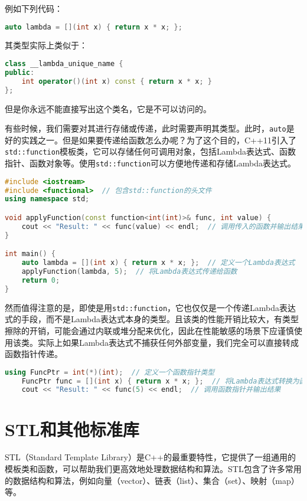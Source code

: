 例如下列代码：
\begin{lstlisting}[language=C++]
auto lambda = [](int x) { return x * x; };  
\end{lstlisting}
其类型实际上类似于：
\begin{lstlisting}[language=C++]
class __lambda_unique_name {
public:
    int operator()(int x) const { return x * x; }
};
\end{lstlisting}
但是你永远不能直接写出这个类名，它是不可以访问的。

有些时候，我们需要对其进行存储或传递，此时需要声明其类型。此时，\texttt{auto}是好的实践之一。但是如果要传递给函数怎么办呢？为了这个目的，C++11引入了\texttt{std::function}模板类，它可以存储任何可调用对象，包括Lambda表达式、函数指针、函数对象等。使用\texttt{std::function}可以方便地传递和存储Lambda表达式。
\begin{lstlisting}[language=C++]
#include <iostream>
#include <functional>  // 包含std::function的头文件
using namespace std;

void applyFunction(const function<int(int)>& func, int value) {
    cout << "Result: " << func(value) << endl;  // 调用传入的函数并输出结果
}

int main() {
    auto lambda = [](int x) { return x * x; };  // 定义一个Lambda表达式
    applyFunction(lambda, 5);  // 将Lambda表达式传递给函数
    return 0;
}
\end{lstlisting}
然而值得注意的是，即使是用\texttt{std::function}，它也仅仅是一个传递Lambda表达式的手段，而不是Lambda表达式本身的类型。且该类的性能开销比较大，有类型擦除的开销，可能会通过内联或堆分配来优化，因此在性能敏感的场景下应谨慎使用该类。实际上如果Lambda表达式不捕获任何外部变量，我们完全可以直接转成函数指针传递。
\begin{lstlisting}[language=C++]
    using FuncPtr = int(*)(int);  // 定义一个函数指针类型
    FuncPtr func = [](int x) { return x * x; };  // 将Lambda表达式转换为函数指针
    cout << "Result: " << func(5) << endl;  // 调用函数指针并输出结果
\end{lstlisting}

\section{STL和其他标准库}

STL（Standard Template Library）是C++的最重要特性，它提供了一组通用的模板类和函数，可以帮助我们更高效地处理数据结构和算法。STL包含了许多常用的数据结构和算法，例如向量（vector）、链表（list）、集合（set）、映射（map）等。

